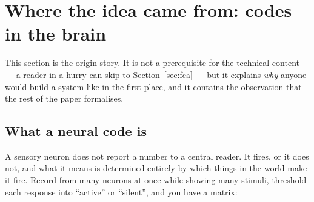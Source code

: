 \section{Where the idea came from: codes in the brain}
\label{sec:neural}

This section is the origin story. It is not a prerequisite for the technical
content --- a reader in a hurry can skip to Section~\ref{sec:fca} --- but it
explains \emph{why} anyone would build a system like \odag{} in the first
place, and it contains the observation that the rest of the paper formalises.

\subsection{What a neural code is}

A sensory neuron does not report a number to a central reader. It fires, or it
does not, and what it means is determined entirely by which things in the
world make it fire. Record from many neurons at once while showing many
stimuli, threshold each response into ``active'' or ``silent'', and you have a
matrix:

\begin{center}
\end{center}


